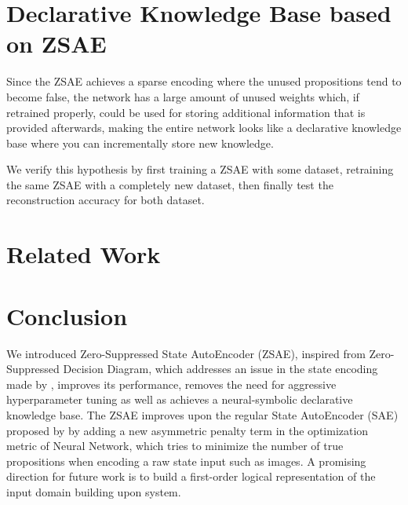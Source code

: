 \section{Declarative Knowledge Base based on ZSAE}

Since the ZSAE achieves a sparse encoding where the unused propositions
tend to become false, the network has a large amount of unused weights
which, if retrained properly, could be used for storing additional
information that is provided afterwards, making the entire network looks
like a declarative knowledge base where you can incrementally store
new knowledge.

We verify this hypothesis by first training a ZSAE with some dataset, retraining the same ZSAE with
a completely new dataset, then finally test the reconstruction accuracy for both dataset.

\section{Related Work}






\section{Conclusion}
\label{conclusion}

We introduced Zero-Suppressed State AutoEncoder (ZSAE), inspired from
Zero-Suppressed Decision Diagram, which addresses an issue in the state
encoding made by \latentplanner, improves its performance, removes the need
for aggressive hyperparameter tuning as well as achieves a
neural-symbolic declarative knowledge base.  The ZSAE improves upon the
regular State AutoEncoder (SAE) proposed by \citeauthor{Asai2018} by
adding a new asymmetric penalty term in the optimization metric of
Neural Network, which tries to minimize the number of true propositions
when encoding a raw state input such as images.
A promising direction for future work is to build a first-order logical
representation of the input domain building upon \latentplanner system.
